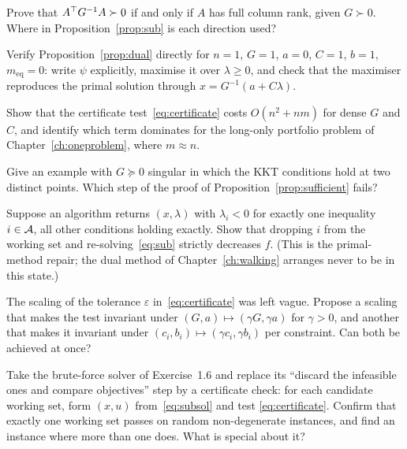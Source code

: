 \begin{exercises}

\begin{exercise}
Prove that $A^{\top} G^{-1} A \succ 0$ if and only if $A$ has full column rank, given
$G \succ 0$. Where in Proposition~\ref{prop:sub} is each direction used?
\end{exercise}

\begin{exercise}
Verify Proposition~\ref{prop:dual} directly for $n = 1$, $G = 1$, $a = 0$,
$C = 1$, $b = 1$, $m_{\mathrm{eq}} = 0$: write $\psi$ explicitly, maximise it over
$\lambda \ge 0$, and check that the maximiser reproduces the primal solution
through $x = G^{-1}(a + C\lambda)$.
\end{exercise}

\begin{exercise}
Show that the certificate test~\eqref{eq:certificate} costs $O(n^2 + nm)$ for
dense $G$ and $C$, and identify which term dominates for the long-only portfolio
problem of Chapter~\ref{ch:oneproblem}, where $m \approx n$.
\end{exercise}

\begin{exercise}
Give an example with $G \succeq 0$ singular in which the KKT conditions hold at
two distinct points. Which step of the proof of Proposition~\ref{prop:sufficient}
fails?
\end{exercise}

\begin{exercise}
Suppose an algorithm returns $(x,\lambda)$ with $\lambda_i < 0$ for exactly one
inequality $i \in \mathcal{A}$, all other conditions holding exactly. Show that
dropping $i$ from the working set and re-solving~\eqref{eq:sub} strictly decreases
$f$. (This is the primal-method repair; the dual method of
Chapter~\ref{ch:walking} arranges never to be in this state.)
\end{exercise}

\begin{exercise}
The scaling of the tolerance $\varepsilon$ in~\eqref{eq:certificate} was left
vague. Propose a scaling that makes the test invariant under
$(G,a) \mapsto (\gamma G, \gamma a)$ for $\gamma > 0$, and another that makes it
invariant under $(c_i, b_i) \mapsto (\gamma c_i, \gamma b_i)$ per constraint.
Can both be achieved at once?
\end{exercise}

\begin{exercise}[Implementation]
Take the brute-force solver of Exercise~1.6 and replace its ``discard the
infeasible ones and compare objectives'' step by a certificate check: for each
candidate working set, form $(x,u)$ from~\eqref{eq:subsol} and test
\eqref{eq:certificate}. Confirm that exactly one working set passes on random
non-degenerate instances, and find an instance where more than one does. What is
special about it?
\end{exercise}

\end{exercises}
